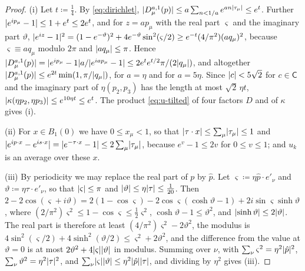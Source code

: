 \documentclass[11pt]{preprint}
\DeclarePairedDelimiter{\abs}{\lvert}{\rvert}
\numberwithin{equation}{section}
\theoremstyle{definition}
\theoremstyle{remark}
\theoremstyle{plain}
\begin{document}
\begin{proof}
(i) Let $t \coloneqq \frac14$. By \eqref{eq:dirichlet}, $\abs{D^{a,1}_\mu(p)} \leq a\sum_{n<1/a}e^{an\abs{\tau_\mu}} \leq e^{t}$. Further $\abs{e^{ip_\mu} - 1} \leq 1 + e^{t} \leq 2e^{t}$, and for $z = ap_\mu$ with the real part $\varsigma$ and the imaginary part $\vartheta$, $\abs{e^{iz} - 1}^2 = (1 - e^{-\vartheta})^2 + 4e^{-\vartheta}\sin^2(\varsigma/2) \geq e^{-t}(4/\pi^2)(aq_\mu)^2$, because $\varsigma \equiv aq_\mu$ modulo $2\pi$ and $\abs{aq_\mu} \leq \pi$. Hence $\abs{D^{a,1}_\mu(p)} = \abs{e^{ip_\mu} - 1}a/\abs{e^{iap_\mu} - 1} \leq 2e^{t}e^{t/2}\pi/(2\abs{q_\mu})$, and altogether $\abs{D^{a,1}_\mu(p)} \leq e^{2t}\min(1, \pi/\abs{q_\mu})$, for $a = \eta$ and for $a = 5\eta$. Since $\abs{c} < 5\sqrt2$ for $c \in \mathsf C$ and the imaginary part of $\eta(p_2, p_3)$ has the length at most $\sqrt2\,\eta t$, $\abs{\kappa(\eta p_2, \eta p_3)} \leq e^{10\eta t} \leq e^{t}$. The product \eqref{eq:u-tilted} of four factors $D$ and of $\kappa$ gives (i).

(ii) For $x \in B_1(0)$ we have $0 \leq x_\mu < 1$, so that $\abs{\tau \cdot x} \leq \sum_\mu\abs{\tau_\mu} \leq 1$ and $\abs{e^{ip \cdot x} - e^{is \cdot x}} = \abs{e^{-\tau \cdot x} - 1} \leq 2\sum_\mu\abs{\tau_\mu}$, because $e^v - 1 \leq 2v$ for $0 \leq v \leq 1$; and $u_k$ is an average over these $x$.

(iii) By periodicity we may replace the real part of $p$ by $\hat p$. Let $\varsigma \coloneqq \eta\hat p \cdot e'_\nu$ and $\vartheta \coloneqq \eta\tau \cdot e'_\nu$, so that $\abs\varsigma \leq \pi$ and $\abs\vartheta \leq \eta\abs\tau \leq \frac{1}{20}$. Then $2 - 2\cos(\varsigma + i\vartheta) = 2(1 - \cos\varsigma) - 2\cos\varsigma(\cosh\vartheta - 1) + 2i\sin\varsigma\sinh\vartheta$, where $(2/\pi^2)\varsigma^2 \leq 1 - \cos\varsigma \leq \frac12\varsigma^2$, $\cosh\vartheta - 1 \leq \vartheta^2$, and $\abs{\sinh\vartheta} \leq 2\abs\vartheta$. The real part is therefore at least $(4/\pi^2)\varsigma^2 - 2\vartheta^2$, the modulus is $4\sin^2(\varsigma/2) + 4\sinh^2(\vartheta/2) \leq \varsigma^2 + 2\vartheta^2$, and the difference from the value at $\vartheta = 0$ is at most $2\vartheta^2 + 4\abs\varsigma\abs\vartheta$ in modulus. Summing over $\nu$, with $\sum_\nu\varsigma^2 = \eta^2\abs{\hat p}^2$, $\sum_\nu\vartheta^2 = \eta^2\abs\tau^2$, and $\sum_\nu\abs\varsigma\abs\vartheta \leq \eta^2\abs{\hat p}\abs\tau$, and dividing by $\eta^2$ gives (iii).
\end{proof}
\end{document}
